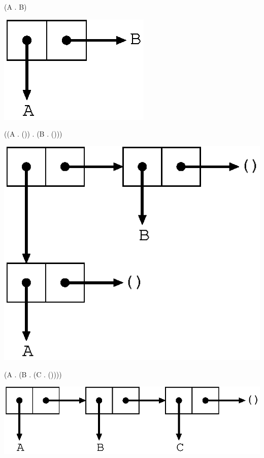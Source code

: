 \documentclass[mingoth,a4paper]{jsarticle}
\begin{document}
\begin{commandline}
 (A . B)
\end{commandline}

\includegraphics[scale=0.5]{image200903/abpair.eps}

\begin{commandline}
((A . ()) . (B . ()))
\end{commandline}

\includegraphics[scale=0.5]{image200903/pairs.eps}

\begin{commandline}
(A . (B . (C . ())))
\end{commandline}

\includegraphics[scale=0.5]{image200903/lpair.eps}
\end{document}

